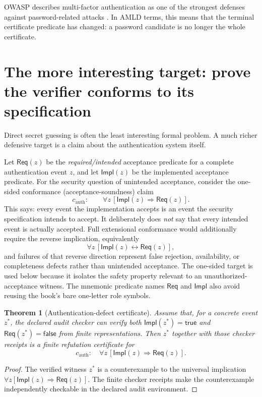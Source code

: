 \documentclass[11pt,openany]{book}
\newtheorem{theorem}{Theorem}[chapter]
\theoremstyle{definition}
\theoremstyle{remark}
\begin{document}
OWASP describes multi-factor authentication as one of the strongest defenses against password-related attacks \cite{OWASPAuth}. In AMLD terms, this means that the terminal certificate predicate has changed: a password candidate is no longer the whole certificate.

\section{The more interesting target: prove the verifier conforms to its specification}
Direct secret guessing is often the least interesting formal problem. A much richer defensive target is a claim about the authentication system itself.

Let $\mathsf{Req}(z)$ be the \emph{required/intended} acceptance predicate for a complete authentication event $z$, and let $\mathsf{Impl}(z)$ be the implemented acceptance predicate. For the security question of unintended acceptance, consider the one-sided conformance (acceptance-soundness) claim
\[
c_{\mathrm{auth}}:\qquad \forall z\,[\mathsf{Impl}(z)\Rightarrow \mathsf{Req}(z)].
\]
This says: every event the implementation accepts is an event the security specification intends to accept. It deliberately does \emph{not} say that every intended event is actually accepted. Full extensional conformance would additionally require the reverse implication, equivalently
\[
\forall z\,[\mathsf{Impl}(z)\leftrightarrow \mathsf{Req}(z)],
\]
and failures of that reverse direction represent false rejection, availability, or completeness defects rather than unintended acceptance. The one-sided target is used below because it isolates the safety property relevant to an unauthorized-acceptance witness. The mnemonic predicate names $\mathsf{Req}$ and $\mathsf{Impl}$ also avoid reusing the book's bare one-letter role symbols.

\begin{theorem}[Authentication-defect certificate]\label{thm:defectcert}
Assume that, for a concrete event $z^*$, the declared audit checker can verify both $\mathsf{Impl}(z^*)=\textsf{true}$ and $\mathsf{Req}(z^*)=\textsf{false}$ from finite representations. Then $z^*$ together with those checker receipts is a finite refutation certificate for
\[
c_{\mathrm{auth}}:\quad \forall z\,[\mathsf{Impl}(z)\Rightarrow \mathsf{Req}(z)].
\]
\end{theorem}
\begin{proof}
The verified witness $z^*$ is a counterexample to the universal implication $\forall z[\mathsf{Impl}(z)\Rightarrow \mathsf{Req}(z)]$. The finite checker receipts make the counterexample independently checkable in the declared audit environment.
\end{proof}
\end{document}
